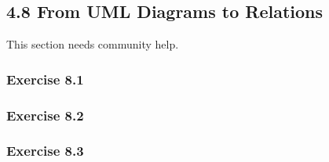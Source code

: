 \documentclass[../../main.tex]{subfiles}
\begin{document}
\subsection{4.8 From UML Diagrams to Relations}

This section needs community help.

\subsubsection*{Exercise 8.1}

\subsubsection*{Exercise 8.2}

\subsubsection*{Exercise 8.3}
\end{document}
